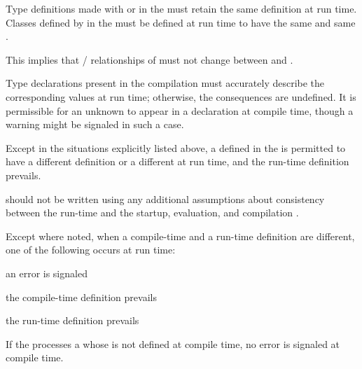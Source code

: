  \itemitem{\bull} Type definitions made with  or
 in the  must
retain the same definition at run time.  Classes defined by 
in the  must be defined
at run time to have the same  and same 
.

This implies that / relationships of 
 must not change between  and .  
 
 \itemitem{\bull} Type declarations present in the compilation 
 must accurately describe the corresponding values at run time;
otherwise, the consequences are undefined.  It is permissible
for an unknown  to appear in a declaration at 
compile time, though a warning might be signaled in such a case.

 \itemitem{\bull} Except in the situations explicitly listed above, a
 defined in the 
is permitted to have a different definition or a different 
at run time, and the run-time definition prevails.

\endlist 

 should not be written using any additional
assumptions about consistency between the run-time 
 and the startup, evaluation, and compilation 
.

Except where noted, when a compile-time and a run-time definition are
different, one of the following occurs at run time:

\beginlist
                                                          
\item{\bull} an error  is signaled
\item{\bull} the compile-time definition prevails
\item{\bull} the run-time definition prevails

\endlist
 
If the  processes a  whose  
is not defined at compile time, no error is signaled at compile time.

\endsubsubsection%
\endsubSection%
 
